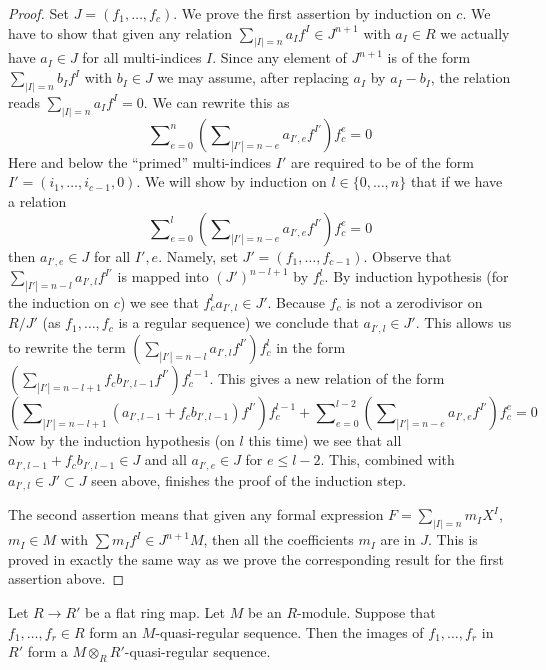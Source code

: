 \begin{proof}
Set $J = (f_1, \ldots, f_c)$.
We prove the first assertion by induction on $c$.
We have to show that given any relation
$\sum_{|I| = n} a_I f^I \in J^{n + 1}$ with $a_I \in R$ we
actually have $a_I \in J$ for all multi-indices $I$. Since
any element of $J^{n + 1}$ is of the form $\sum_{|I| = n} b_I f^I$
with $b_I \in J$ we may assume, after replacing $a_I$ by $a_I - b_I$,
the relation reads $\sum_{|I| = n} a_I f^I = 0$. We can rewrite
this as
$$
\sum\nolimits_{e = 0}^n
\left(
\sum\nolimits_{|I'| = n - e}
a_{I', e} f^{I'}
\right)
f_c^e
=
0
$$
Here and below the ``primed'' multi-indices $I'$ are required to be of the form
$I' = (i_1, \ldots, i_{c - 1}, 0)$. We will show by
induction on $l \in \{0, \ldots, n\}$
that if we have a relation
$$
\sum\nolimits_{e = 0}^l
\left(
\sum\nolimits_{|I'| = n - e}
a_{I', e} f^{I'}
\right)
f_c^e
=
0
$$
then $a_{I', e} \in J$ for all $I', e$.
Namely, set $J' = (f_1, \ldots, f_{c-1})$.
Observe that $\sum\nolimits_{|I'| = n - l} a_{I', l} f^{I'}$
is mapped into $(J')^{n - l + 1}$ by $f_c^{l}$.
By induction hypothesis (for the induction on $c$)
we see that $f_c^l a_{I', l} \in J'$.
Because $f_c$ is not a zerodivisor on $R/J'$ (as $f_1, \ldots, f_c$
is a regular sequence) we conclude that $a_{I', l} \in J'$.
This allows us to rewrite the term
$(\sum\nolimits_{|I'| = n - l} a_{I', l} f^{I'})f_c^l$
in the form $(\sum\nolimits_{|I'| = n - l + 1} f_c b_{I', l - 1}
f^{I'})f_c^{l-1}$. This gives a new relation of the form
$$
\left(\sum\nolimits_{|I'| = n - l + 1}
(a_{I', l-1} + f_c b_{I', l - 1}) f^{I'}\right)f_c^{l-1}
+
\sum\nolimits_{e = 0}^{l - 2}
\left(
\sum\nolimits_{|I'| = n - e}
a_{I', e} f^{I'}
\right)
f_c^e
=
0
$$
Now by the induction hypothesis (on $l$ this time) we see that
all $a_{I', l-1} + f_c b_{I', l - 1} \in J$ and
all $a_{I', e} \in J$ for $e \leq l - 2$. This, combined with
$a_{I', l} \in J' \subset J$ seen above, finishes the proof of the
induction step.

\medskip\noindent
The second assertion means that given any formal expression
$F = \sum_{|I| = n} m_I X^I$, $m_I \in M$ with $\sum m_I f^I
\in J^{n + 1}M$, then all the coefficients $m_I$ are in $J$.
This is proved in exactly the same way as we prove the corresponding
result for the first assertion above.
\end{proof}

\begin{lemma}
\label{lemma-flat-base-change-quasi-regular}
Let $R \to R'$ be a flat ring map. Let $M$ be an $R$-module.
Suppose that $f_1, \ldots, f_r \in R$ form an $M$-quasi-regular sequence.
Then the images of $f_1, \ldots, f_r$ in
$R'$ form a $M \otimes_R R'$-quasi-regular sequence.
\end{lemma}

